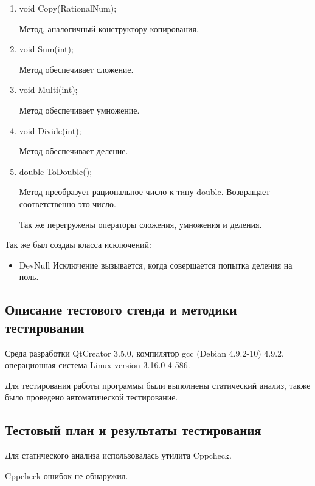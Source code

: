 \documentclass[12pt,a4paper]{report}
\begin{document}
\begin{enumerate}	
	\item void Copy(RationalNum);
	
	Метод, аналогичный конструктору копирования.
	
	\item void Sum(int);
	
	Метод обеспечивает сложение. 
	
	\item void Multi(int);
	
	Метод обеспечивает умножение.
	
	\item void Divide(int);
	
	Метод обеспечивает деление.
	
	\item double ToDouble();
	
	Метод преобразует рациональное число к типу double. Возвращает соответственно это число.
	
	Так же перегружены операторы сложения, умножения и деления.

\end{enumerate}
	Так же был создаы класса исключений:
	
		\begin{itemize}
		\item DevNull
		Исключение вызывается, когда совершается попытка деления на ноль.
		\end{itemize}
		
		
\subsection{Описание тестового стенда и методики тестирования}
Среда разработки QtCreator 3.5.0, компилятор gcc (Debian 4.9.2-10) 4.9.2, операционная система Linux version 3.16.0-4-586.

Для тестирования работы программы были выполнены статический анализ, также было проведено автоматической тестирование.

\subsection{Тестовый план и результаты тестирования}

Для статического анализа использовалась утилита Cppcheck.

\vspace{\baselineskip}
Cppcheck ошибок не обнаружил.
\vspace{\baselineskip}
\end{document}

